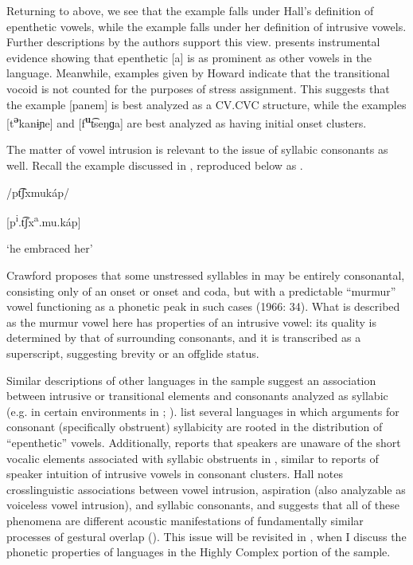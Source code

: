   Returning to  above, we see that the  example falls under Hall’s definition of epenthetic vowels, while the  example falls under her definition of intrusive vowels. Further descriptions by the authors support this view. \citet[36]{Dol2007} presents instrumental evidence showing that epenthetic [a] is as prominent as other vowels in the language. Meanwhile, examples given by Howard indicate that the transitional vocoid is not counted for the purposes of stress assignment. This suggests that the  example [panem] is best analyzed as a CV.CVC structure, while the  examples [t\textbf{\textsuperscript{ə}}kanɨɲe] and\linebreak{} [f\textbf{\textsuperscript{u}}t͡seŋɡa] are best analyzed as having initial onset clusters.

  The matter of vowel intrusion is relevant to the issue of syllabic consonants as well. Recall the  example discussed in , reproduced below as .

\ea\label{ex:3.10}

  /pt͡ʃxmukáp/ 
  
  [p\textsuperscript{i}.t͡ʃx\textsuperscript{a}.mu.káp]

\glt ‘he embraced her’
\citep[43]{Crawford1966}
\z

Crawford proposes that some unstressed syllables in  may be entirely consonantal, consisting only of an onset or onset and coda, but with a predictable ``murmur'' vowel functioning as a phonetic peak in such cases (1966: 34). What is described as the murmur vowel here has properties of an intrusive vowel: its quality is determined by that of surrounding consonants, and it is transcribed as a superscript, suggesting brevity or an offglide status.

Similar descriptions of other languages in the sample suggest an association between intrusive or transitional elements and consonants analyzed as syllabic (e.g. in certain environments in ; \citealt{DellElmedlaoui2002}). \citet{HargusBeavert2006} list several languages in which arguments for consonant (specifically obstruent) syllabicity are rooted in the distribution of ``epenthetic'' vowels. Additionally, \citet[185--186]{Bell1978a} reports that speakers are unaware of the short vocalic elements associated with syllabic obstruents in , similar to reports of speaker intuition of intrusive vowels in consonant clusters. Hall notes crosslinguistic associations between vowel intrusion, aspiration (also analyzable as voiceless vowel intrusion), and syllabic consonants, and suggests that all of these phenomena are different acoustic manifestations of fundamentally similar processes of gestural overlap (\citeyear[413]{Hall2006}). This issue will be revisited in , when I discuss the phonetic properties of languages in the Highly Complex portion of the sample.

